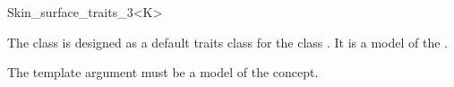 
\begin{ccRefClass}{Skin_surface_traits_3<K>}
  \ccDefinition 

  The class \ccRefName{} is designed as a default traits class for the
  class . It is a model of
  the .
  
  The template argument  must be a model of the 
  concept.

    




  \ccIsModel 
%

\end{ccRefClass}


